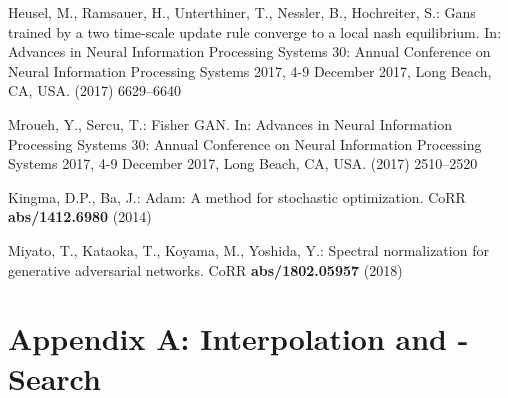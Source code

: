 \documentclass[runningheads]{llncs}
\begin{document}
\begin{thebibliography}{10}
Heusel, M., Ramsauer, H., Unterthiner, T., Nessler, B., Hochreiter, S.:
\newblock Gans trained by a two time-scale update rule converge to a local nash
  equilibrium.
\newblock In: Advances in Neural Information Processing Systems 30: Annual
  Conference on Neural Information Processing Systems 2017, 4-9 December 2017,
  Long Beach, CA, {USA}. (2017)  6629--6640

Mroueh, Y., Sercu, T.:
\newblock Fisher {GAN}.
\newblock In: Advances in Neural Information Processing Systems 30: Annual
  Conference on Neural Information Processing Systems 2017, 4-9 December 2017,
  Long Beach, CA, {USA}. (2017)  2510--2520

Kingma, D.P., Ba, J.:
\newblock Adam: {A} method for stochastic optimization.
\newblock CoRR \textbf{abs/1412.6980} (2014)

Miyato, T., Kataoka, T., Koyama, M., Yoshida, Y.:
\newblock Spectral normalization for generative adversarial networks.
\newblock CoRR \textbf{abs/1802.05957} (2018)

\end{thebibliography}
     
    \clearpage
    
    \setcounter{secnumdepth}{0}
    
    \section{Appendix A: Interpolation and -Search}
    
    \vfill
    
\end{document}
